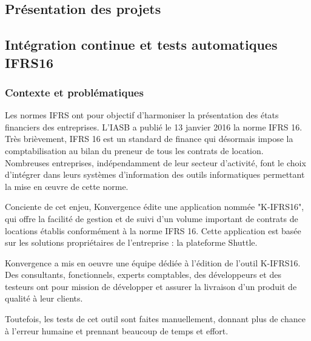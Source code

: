 \begin{spacing}{1.2}
\vspace{-3mm}
\section{Présentation des projets}
\subsection{Intégration continue et tests automatiques IFRS16}
\subsubsection{Contexte et problématiques}

Les normes IFRS ont pour objectif d’harmoniser la présentation des états financiers des entreprises.
L'IASB a publié le 13 janvier 2016 la norme IFRS 16\cite{ifrs16}. 
Très brièvement, IFRS 16 est un standard de finance qui désormais impose la comptabilisation au bilan du preneur de tous les contrats de location.
Nombreuses entreprises, indépendamment de leur secteur d’activité, font le choix d’intégrer dans leurs systèmes d’information des outils informatiques permettant la mise en œuvre de cette norme.

Conciente de cet enjeu, Konvergence édite une application nommée "K-IFRS16", qui offre la facilité de gestion et de suivi d’un volume important de contrats de locations établis conformément à la norme IFRS 16. Cette application est basée sur les solutions propriétaires de l’entreprise : la plateforme Shuttle. 

Konvergence a mis en oeuvre une équipe dédiée à l'édition de l'outil K-IFRS16. Des consultants, fonctionnels, experts comptables, des développeurs et des testeurs ont pour mission de développer et assurer la livraison d'un produit de qualité à leur clients.

Toutefois, les tests de cet outil sont faites manuellement, donnant plus de chance à l'erreur humaine et prennant beaucoup de temps et effort.


\end{spacing}
